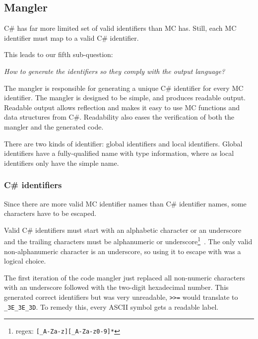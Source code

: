 \subsection{Mangler}
C\# has far more limited set of valid identifiers than MC has.
Still, each MC identifier must map to a valid C\# identifier.

This leads to our fifth sub-question:

\textit{How to generate the identifiers so they comply with the output language?}

The mangler is responsible for generating a unique C\# identifier for every MC identifier.
The mangler is designed to be simple, and produces readable output.
Readable output allows reflection and makes it easy to use MC functions and data structures from C\#.
Readability also eases the verification of both the mangler and the generated code.

There are two kinds of identifier: global identifiers and local identifiers.
Global identifiers have a fully-qualified name with type information, where as local identifiers only have the simple name.

\subsubsection{C\# identifiers}
Since there are more valid MC identifier names than C\# identifier names, some characters have to be escaped.

Valid C\# identifiers must start with an alphabetic character or an underscore and the trailing characters must be alphanumeric or underscore\footnote{regex: \texttt{[\_A-Za-z][\_A-Za-z0-9]*}}~\cite{msdn_identifiers}.
The only valid non-alphanumeric character is an underscore, so using it to escape with was a logical choice.

The first iteration of the code mangler just replaced all non-numeric characters with an underscore followed with the two-digit hexadecimal number.
This generated correct identifiers but was very unreadable, \verb|>>=| would translate to \verb|_3E_3E_3D|.
To remedy this, every ASCII symbol gets a readable label.

